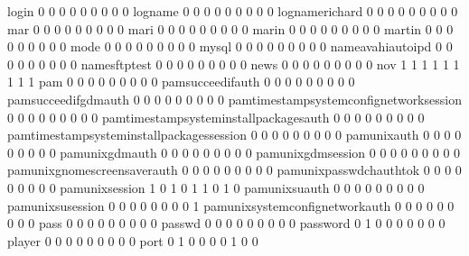 \documentclass[compress,8pt]{beamer}
\begin{document}
\begin{frame}
\begin{Schunk}
  login                                      0   0   0   0   0   0   0   0   0
  logname                                    0   0   0   0   0   0   0   0   0
  lognamerichard                             0   0   0   0   0   0   0   0   0
  mar                                        0   0   0   0   0   0   0   0   0
  mari                                       0   0   0   0   0   0   0   0   0
  marin                                      0   0   0   0   0   0   0   0   0
  martin                                     0   0   0   0   0   0   0   0   0
  mode                                       0   0   0   0   0   0   0   0   0
  mysql                                      0   0   0   0   0   0   0   0   0
  nameavahiautoipd                           0   0   0   0   0   0   0   0   0
  namesftptest                               0   0   0   0   0   0   0   0   0
  news                                       0   0   0   0   0   0   0   0   0
  nov                                        1   1   1   1   1   1   1   1   1
  pam                                        0   0   0   0   0   0   0   0   0
  pamsucceedifauth                           0   0   0   0   0   0   0   0   0
  pamsucceedifgdmauth                        0   0   0   0   0   0   0   0   0
  pamtimestampsystemconfignetworksession     0   0   0   0   0   0   0   0   0
  pamtimestampsysteminstallpackagesauth      0   0   0   0   0   0   0   0   0
  pamtimestampsysteminstallpackagessession   0   0   0   0   0   0   0   0   0
  pamunixauth                                0   0   0   0   0   0   0   0   0
  pamunixgdmauth                             0   0   0   0   0   0   0   0   0
  pamunixgdmsession                          0   0   0   0   0   0   0   0   0
  pamunixgnomescreensaverauth                0   0   0   0   0   0   0   0   0
  pamunixpasswdchauthtok                     0   0   0   0   0   0   0   0   0
  pamunixsession                             1   0   1   0   1   1   0   1   0
  pamunixsuauth                              0   0   0   0   0   0   0   0   0
  pamunixsusession                           0   0   0   0   0   0   0   0   1
  pamunixsystemconfignetworkauth             0   0   0   0   0   0   0   0   0
  pass                                       0   0   0   0   0   0   0   0   0
  passwd                                     0   0   0   0   0   0   0   0   0
  password                                   0   1   0   0   0   0   0   0   0
  player                                     0   0   0   0   0   0   0   0   0
  port                                       0   1   0   0   0   0   1   0   0

\end{Schunk}
\end{frame}
\end{document}
